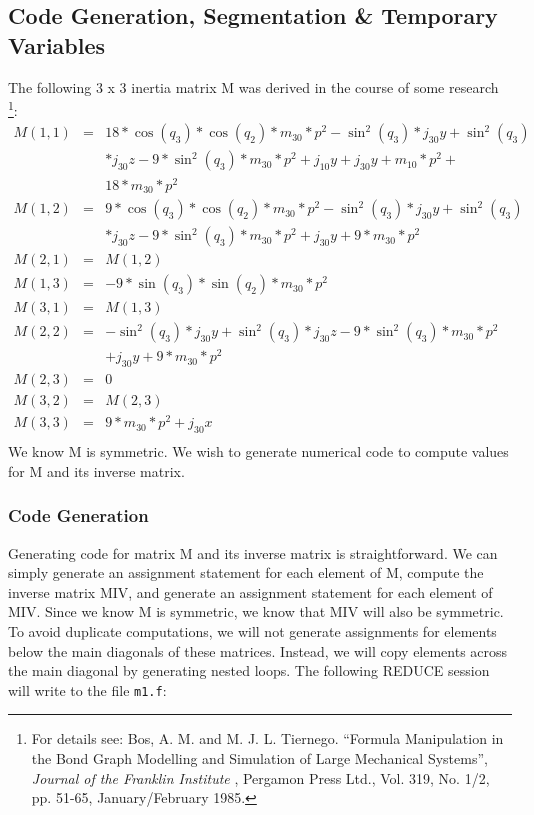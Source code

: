 \subsection{Code Generation, Segmentation \& Temporary Variables}
The following 3 x 3 inertia matrix M was derived in the course of
some research \footnote{For details see:
Bos, A. M. and M. J. L. Tiernego.  ``Formula Manipulation in the
Bond Graph Modelling and Simulation of Large Mechanical Systems'',
{\it Journal of the Franklin Institute} , Pergamon Press Ltd.,
Vol. 319, No. 1/2, pp. 51-65, January/February 1985.}:
\begin{eqnarray*}
M(1,1) & = & 18*\cos (q_3)*\cos (q_2)*m_{30}*p^2 - \sin ^2(q_3) *j_{30}y +
 \sin ^2(q_3) \\
  & & *j_{30}z - 9*\sin ^2(q_3) *m_{30}*p^2  + j_{10}y + j_{30}y +
 m_{10}*p^2  + \\
 & & 18*m_{30}*p^2\\
M(1,2) & = & 9*\cos (q_3)*\cos (q_2)*m_{30}*p^2  - \sin ^2(q_3) *j_{30}y
 +\sin ^2(q_3) \\
  & & *j_{30}z - 9*\sin ^2(q_3) *m_{30}*p^2 + j_{30}y + 9* m_{30}*p^2\\
M(2,1) & = & M(1,2)\\
M(1,3) & = & - 9*\sin (q_3)*\sin (q_2)*m_{30}*p^2\\
M(3,1) & = & M(1,3)\\
M(2,2) & = & - \sin ^2(q_3) *j_{30}y + \sin ^2(q_3) *j_{30}z -
 9*\sin ^2(q_3)*m_{30}*p^2 \\
& & + j_{30}y + 9*m_{30}*p^2\\
M(2,3) & = & 0\\
M(3,2) & = & M(2,3)\\
M(3,3) & = & 9*m_{30}*p^2 + j_{30}x\\
\end{eqnarray*}
We know M is symmetric.  We wish to generate numerical code
to compute values for M and its inverse matrix.

\subsubsection{Code Generation}
\label{code:example}
Generating code for matrix M and its inverse matrix is
straightforward.  We can simply generate an assignment statement
for each element of M, compute the inverse matrix MIV, and generate
an assignment statement for each element of MIV.  Since we
know M is symmetric, we know that MIV will also be symmetric.  To
avoid duplicate computations, we will not generate assignments
for elements below the main diagonals of these matrices.  Instead,
we will copy elements across the main diagonal by generating
nested loops.  The following REDUCE session will write to the file {\tt m1.f}:

